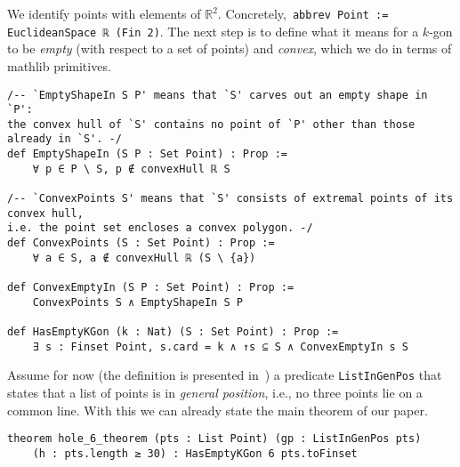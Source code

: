 We identify points with elements of $\mathbb{R}^2$. Concretely,~\lstinline|abbrev Point := EuclideanSpace ℝ (Fin 2)|.
The next step is to define what it means for a $k$-gon to be \emph{empty} (with respect to a set of points) and \emph{convex}, which we do in terms of \textsf{mathlib} primitives.

\begin{lstlisting}
/-- `EmptyShapeIn S P' means that `S' carves out an empty shape in `P':
the convex hull of `S' contains no point of `P' other than those already in `S'. -/
def EmptyShapeIn (S P : Set Point) : Prop :=
    ∀ p ∈ P \ S, p ∉ convexHull ℝ S

/-- `ConvexPoints S' means that `S' consists of extremal points of its convex hull,
i.e. the point set encloses a convex polygon. -/
def ConvexPoints (S : Set Point) : Prop :=
    ∀ a ∈ S, a ∉ convexHull ℝ (S \ {a})

def ConvexEmptyIn (S P : Set Point) : Prop :=
    ConvexPoints S ∧ EmptyShapeIn S P

def HasEmptyKGon (k : Nat) (S : Set Point) : Prop :=
    ∃ s : Finset Point, s.card = k ∧ ↑s ⊆ S ∧ ConvexEmptyIn s S
\end{lstlisting}

Assume for now (the definition is presented in~) a predicate \lstinline|ListInGenPos| that states that a list of points is in \emph{general position}, i.e., no three points lie on a common line.
With this we can already state the main theorem of our paper.

\begin{lstlisting}
theorem hole_6_theorem (pts : List Point) (gp : ListInGenPos pts)
    (h : pts.length ≥ 30) : HasEmptyKGon 6 pts.toFinset
\end{lstlisting}

